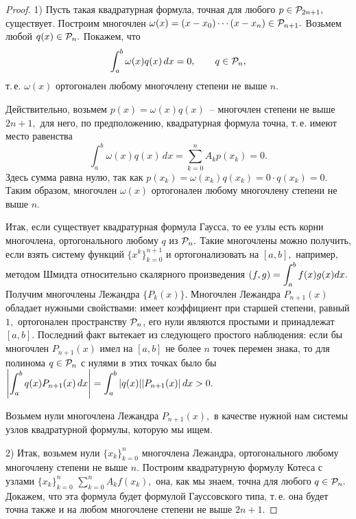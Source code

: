 \begin{proof}
1) Пусть такая квадратурная формула, точная для любого $p \in \mathcal{P}_{2n+1},$
существует. Построим многочлен $\omega(x)=(x-x_0)\cdots (x-x_n) \in \mathcal{P}_{n+1}.$
Возьмем любой $q(x) \in \mathcal{P}_{n}.$ Покажем, что
\[
  \int_a^b \omega (x)q(x)\,dx =0, \qquad  q \in \mathcal{P}_{n},
\]
т.\,е. $\omega(x)$ ортогонален любому многочлену степени не
выше $n.$

Действительно, возьмем $p(x)=\omega(x)q(x)$~-- многочлен
степени не выше $2n+1,$ для него, по предположению,
квадратурная формула точна, т.\,е. имеют место равенства
\[
  \int_a^b \omega (x)q(x)\,dx =
  \sum\limits_{k=0}^n A_k p(x_k)=0.
\]
Здесь сумма равна нулю, так как
$p(x_k)=\omega (x_k)q(x_k)=0\cdot q(x_k)=0.$ Таким образом,
многочлен $\omega(x)$ ортогонален любому многочлену степени не выше $n.$

Итак, если существует квадратурная формула Гаусса, то
ее узлы есть корни многочлена, ортогонального любому
$q$ из $\mathcal{P}_{n}.$
Такие многочлены можно получить, если взять систему функций
$\{x^k \}_{k=0}^{n+1}$
и ортогонализовать на $[a,b],$
например, методом Шмидта относительно скалярного произведения
$(f,g)=\displaystyle\int_a^b f(x)g(x) dx.$ Получим многочлены Лежандра $\{P_k(x)\}.$
Многочлен Лежандра $P_{n+1}(x)$
обладает нужными свойствами: имеет
коэффициент при старшей степени, равный $1,$ ортогонален пространству $\mathcal{P}_n$, его нули являются простыми и принадлежат $[a,b]$.
Последний факт вытекает из следующего простого наблюдения:
если бы многочлен $P_{n+1}(x)$ имел на $[a,b]$ не
более $n$ точек перемен знака, то для полинома $q\in \mathcal{P}_n$ с нулями в этих точках было бы $\left|\displaystyle\int_a^b q(x)P_{n+1}(x)\,dx\right|=
\displaystyle\int_a^b |q(x)||P_{n+1}(x)|\,dx>0.$

Возьмем нули многочлена Лежандра $P_{n+1}(x),$
в качестве нужной нам системы узлов квадратурной формулы,
которую мы ищем.

2) Итак, возьмем нули
$\{x_k \}_{k=0}^{n}$
многочлена Лежандра,
ортогонального любому многочлену степени не выше $n.$
Построим квадратурную формулу {Котеса с узлами $\{x_k \}_{k=0}^{n}$}
\newline
$\sum\limits_{k=0}^n A_k f(x_k),$ она, как мы знаем, точна для
любого $q \in \mathcal{P}_n.$ Докажем, что эта формула будет
формулой Гауссовского типа, т.\,е. она будет точна также и на
любом многочлене степени не выше $2n+1.$


\end{proof}
